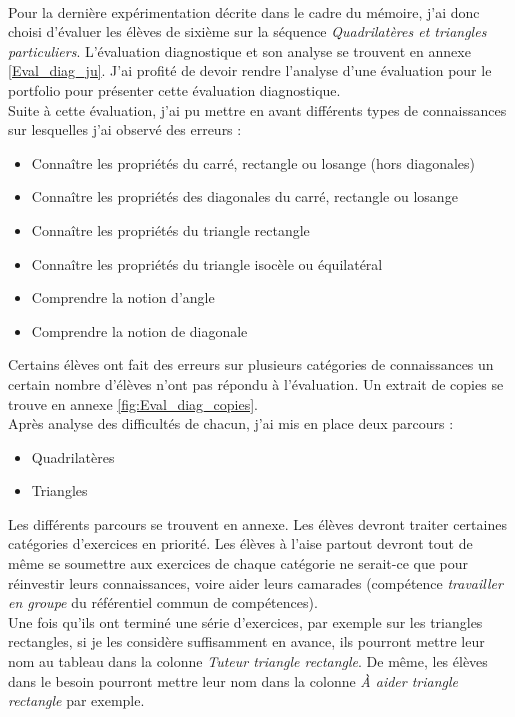 \paragraph{} Pour la dernière expérimentation décrite dans le cadre du mémoire, j'ai donc choisi d'évaluer les élèves de sixième sur la séquence \textit{Quadrilatères et triangles particuliers}. L'évaluation diagnostique et son analyse se trouvent en annexe \ref{Eval_diag_ju}. J'ai profité de devoir rendre l'analyse d'une évaluation pour le portfolio pour présenter cette évaluation diagnostique.\\
Suite à cette évaluation, j'ai pu mettre en avant différents types de connaissances sur lesquelles j'ai observé des erreurs :
\begin{itemize}
	\item Connaître les propriétés du carré, rectangle ou losange (hors diagonales)
	\item Connaître les propriétés des diagonales du carré, rectangle ou losange
	\item Connaître les propriétés du triangle rectangle
	\item Connaître les propriétés du triangle isocèle ou équilatéral
	\item Comprendre la notion d'angle
	\item Comprendre la notion de diagonale
\end{itemize}
Certains élèves ont fait des erreurs sur plusieurs catégories de connaissances un certain nombre d'élèves n'ont pas répondu à l'évaluation. Un extrait de copies se trouve en annexe \ref{fig:Eval_diag_copies}.\\
Après analyse des difficultés de chacun, j'ai mis en place deux parcours :
\begin{itemize}
\item Quadrilatères
\item Triangles
\end{itemize}
Les différents parcours se trouvent en annexe. Les élèves devront traiter certaines catégories d'exercices en priorité.
Les élèves à l'aise partout devront tout de même se soumettre aux exercices de chaque catégorie ne serait-ce que pour réinvestir leurs connaissances, voire aider leurs camarades (compétence \textit{travailler en groupe} du référentiel commun de compétences).\\
Une fois qu'ils ont terminé une série d'exercices, par exemple sur les triangles rectangles, si je les considère suffisamment en avance, ils pourront mettre leur nom au tableau dans la colonne \textit{Tuteur triangle rectangle}. De même, les élèves dans le besoin pourront mettre leur nom dans la colonne \textit{À aider triangle rectangle} par exemple.\\
